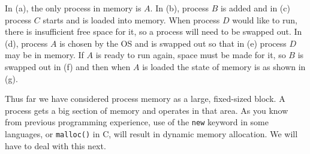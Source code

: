 In (a), the only process in memory is $A$. In (b), process $B$ is added and in (c) process $C$ starts and is loaded into memory. When process $D$ would like to run, there is insufficient free space for it, so a process will need to be swapped out. In (d), process $A$ is chosen by the OS and is swapped out so that in (e) process $D$ may be in memory. If $A$ is ready to run again, space must be made for it, so $B$ is swapped out in (f) and then when $A$ is loaded the state of memory is as shown in (g).

Thus far we have considered process memory as a large, fixed-sized block. A process gets a big section of memory and operates in that area. As you know from previous programming experience, use of the \texttt{new} keyword in some languages, or \texttt{malloc()} in C, will result in dynamic memory allocation. We will have to deal with this next.



